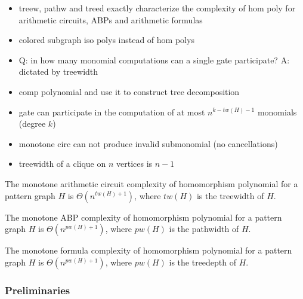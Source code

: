 \begin{itemize}
    \item treew, pathw and treed exactly characterize the complexity of hom poly for arithmetic circuits, ABPs and arithmetic formulas
    \item colored subgraph iso polys instead of hom polys
    \item Q: in how many monomial computations can a single gate participate? A: dictated by treewidth
    \item comp polynomial and use it to construct tree decomposition
    \item gate can participate in the computation of at most $n^{k-tw(H)-1}$ monomials (degree $k$)
    \item monotone circ can not produce invalid submonomial (no cancellations)
    \item treewidth of a clique on $n$ vertices is $n-1$
\end{itemize}


\begin{theorem}
    The monotone arithmetic circuit complexity of homomorphism polynomial for a pattern graph $H$ is $\Theta(n^{tw(H)+1})$, where $tw(H)$ is the treewidth of $H$.
\end{theorem}

\begin{theorem}
    The monotone ABP complexity of homomorphism polynomial for a pattern graph $H$ is $\Theta(n^{pw(H)+1})$, where $pw(H)$ is the pathwidth of $H$.
\end{theorem}

\begin{theorem}
    The monotone formula complexity of homomorphism polynomial for a pattern graph $H$ is $\Theta(n^{pw(H)+1})$, where $pw(H)$ is the treedepth of $H$.
\end{theorem}

\subsubsection{Preliminaries}


